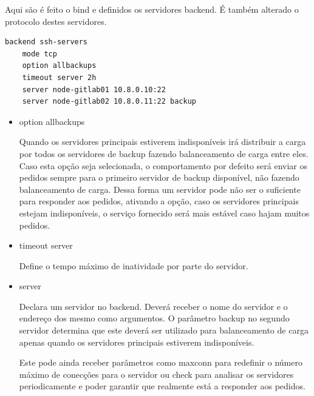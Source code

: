\documentclass[12pt,a4paper]{article}
\begin{document}
Aqui são é feito o bind e definidos os servidores backend. É também alterado o protocolo destes servidores.

\begin{verbatim}
backend ssh-servers  
    mode tcp
    option allbackups
    timeout server 2h
    server node-gitlab01 10.8.0.10:22
    server node-gitlab02 10.8.0.11:22 backup

\end{verbatim}

\begin{itemize}
    \item option allbackups
    
Quando os servidores principais estiverem indisponíveis irá distribuir a carga por todos os servidores de backup fazendo balanceamento de carga entre eles. Caso esta opção seja selecionada, o comportamento por defeito será enviar os pedidos sempre para o primeiro servidor de backup disponível, não fazendo balanceamento de carga. Dessa forma um servidor pode não ser o suficiente para responder aos pedidos, ativando a opção, caso os servidores principais estejam indisponíveis, o serviço fornecido será mais estável caso hajam muitos pedidos.
    
    \item timeout server
    
Define o tempo máximo de inatividade por parte do servidor.
    
    \item server
    
Declara um servidor no backend. Deverá receber o nome do servidor e o endereço dos mesmo como argumentos. O parâmetro backup no segundo servidor determina que este deverá ser utilizado para balanceamento de carga apenas quando os servidores principais estiverem indisponíveis.

Este pode ainda receber parâmetros como maxconn para redefinir o número máximo de conecções para o servidor ou check para analisar os servidores periodicamente e poder garantir que realmente está a responder aos pedidos.
    
\end{itemize}
\end{document}
